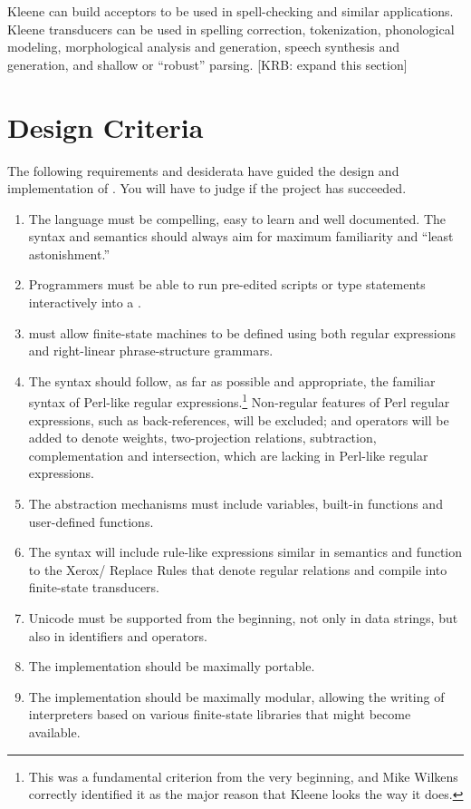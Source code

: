 Kleene can build acceptors to be used in spell-checking and similar
applications.  Kleene transducers can be used in spelling correction,
tokenization, phonological modeling, morphological analysis and
generation, speech synthesis and generation, and shallow or ``robust''
parsing.  [KRB:  expand this section]

\section{Design Criteria}

The following requirements and desiderata have guided the design and
implementation of \Kleene{}.  You will have to judge if the project has
succeeded.

\begin{enumerate}

\item
The \Kleene{} language must be compelling, easy to learn and well documented.  
The syntax and semantics should always aim for maximum
familiarity and ``least astonishment.''

\item
Programmers must be able to run pre-edited scripts or
type statements interactively into a .

\item
\Kleene{} must allow finite-state machines to be defined using 
both regular expressions and right-linear
phrase-structure grammars. 

\item
The syntax should follow, as far as
possible and appropriate, the familiar syntax of Perl-like regular
expressions.\footnote{This was a fundamental criterion from the
very beginning, and Mike Wilkens correctly identified it
as the major reason that Kleene looks the way it does.}  Non-regular features of Perl regular expressions, 
such as back-references, will be
excluded; and operators will be added to denote weights,
two-projection relations, subtraction, complementation and intersection, which are
lacking in Perl-like regular expressions.

\item
The abstraction mechanisms must include variables, built-in functions
and user-defined functions.


\item
The syntax will include rule-like expressions similar in semantics and 
function to the
Xerox/ Replace Rules
\citep{karttunen:1995,karttunen+kempe:1995,karttunen:1996,kempe+karttunen:1996,mohri+sproat:1996} that denote regular relations and
compile into finite-state transducers.  

\item
Unicode must be supported from the beginning, not only in data
strings, but also in \Kleene{} identifiers and operators.

\item
The implementation should be maximally portable.

\item
The implementation should be maximally modular, allowing the writing of
interpreters based on various finite-state libraries that might become
available.
\end{enumerate}

